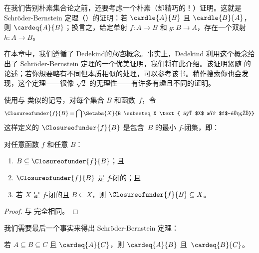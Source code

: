 \documentclass[../../../include/open-logic-section]{subfiles}
\begin{document}


在我们告别朴素集合论之前，还要考虑一个朴素（却精巧的！）证明。这就是 Schr\"oder-Bernstein 定理（）的证明：若 $\cardle{A}{B}$ 且 $\cardle{B}{A}$，则 $\cardeq{A}{B}$；换言之，给定单射 $f \colon A \to B$ 和 $g \colon B \to A$，存在一个双射 $h \colon A \to B$。

在本章中，我们遵循了 Dedekind的\emph{闭包}概念。事实上，Dedekind 利用这个概念给出了 Schr\"oder-Bernstein 定理的一个优美证明，我们将在此介绍。该证明紧随 \citet[pp.~157--8]{Potter2004} 的论述；若你想要略有不同但本质相似的处理，可以参考该书。稍作搜索你也会发现，这个定理——很像 $\sqrt{2}$ 的无理性——有许多有趣且不同的证明。

使用与  类似的记号，对每个集合 $B$ 和函数~$f$，令
\[
\Closureofunder{f}{B} = \bigcap \Setabs{X}{B \subseteq X
\text{ 且 $X$ 是 $f$-闭的}}
\]
这样定义的 $\Closureofunder{f}{B}$ 是包含~$B$ 的最小 $f$-闭集，即：

\begin{lem}
	对任意函数 $f$ 和任意 $B$：
	\begin{enumerate}
		\item{} $B \subseteq \Closureofunder{f}{B}$；且
		\item{} $\Closureofunder{f}{B}$ 是 $f$-闭的；且
		\item{} 若 $X$ 是 $f$-闭的且 $B \subseteq X$，则 $\Closureofunder{f}{B} \subseteq X$。
	\end{enumerate}
\end{lem}

\begin{proof}
	与  完全相同。
\end{proof}


我们需要最后一个事实来得出 Schr\"oder-Bernstein 定理：

\begin{prop}
若 $A \subseteq B \subseteq C$ 且 $\cardeq{A}{C}$，则 $\cardeq{A}{B}$ 且~$\cardeq{B}{C}$。
\end{prop}
\end{document}
